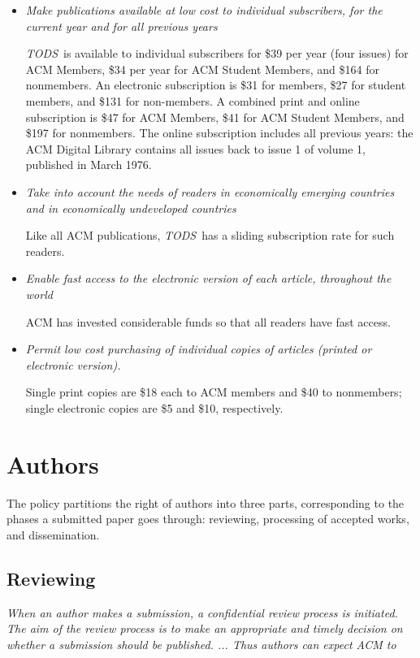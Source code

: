 \documentclass{article}
\newcommand{\tods}{{\em TODS\/}}
\begin{document}
\begin{itemize}
\item {\em Make publications available at low cost to individual
  subscribers, for the current year and for all previous years}

  \tods\ is available to individual subscribers for \$39 per year (four
  issues) for ACM Members, \$34 per year for ACM Student Members, and \$164
  for nonmembers. An electronic subscription is \$31 for members, \$27 for
  student members, and \$131 for non-members. A combined print and online
  subscription is \$47 for ACM Members, \$41 for ACM Student Members, and \$197
  for nonmembers. The online subscription includes all previous years: the
  ACM Digital Library contains all issues back to issue 1 of volume 1, published in
  March 1976.

\item {\em Take into account the needs of readers in economically emerging
  countries and in economically undeveloped countries}

  Like all ACM publications, \tods\ has a sliding subscription rate for
  such readers.

\item {\em Enable fast access to the electronic version of each article,
  throughout the world}

  ACM has invested considerable funds so that all readers have fast access.

\item {\em Permit low cost  purchasing of individual copies of articles
  (printed or electronic version).}

  Single print copies are \$18 each to ACM members and \$40 to nonmembers;
  single electronic copies are \$5 and \$10, respectively.
\end{itemize}

\section{Authors}

The policy partitions the right of authors into three parts, corresponding
to the phases a submitted paper goes through: reviewing, processing of
accepted works, and dissemination.

\subsection{Reviewing}

\noindent
{\em When an author makes a submission, a confidential review process is
initiated. The aim of the review process is to make an appropriate and
timely decision on whether a submission should be published. ... Thus
authors can expect ACM to}
\end{document}
